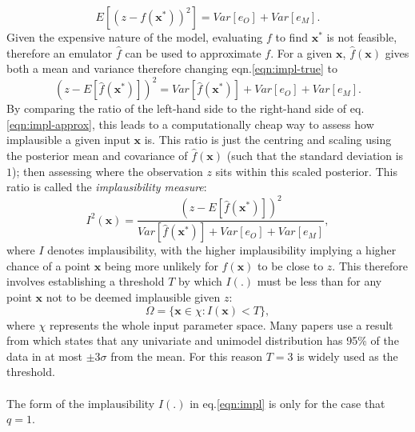 \documentclass{article}
\newcommand{\numOutputs}{q}
\newcommand{\simulator}{f}
\newcommand{\emulator}{\hat{f}}
\newcommand{\inputVec}{\mathbf{x}}
\newcommand{\obs}{z}
\newcommand{\obsError}{e_O}
\newcommand{\modelDisc}{e_M}
\newcommand{\paramSpace}{\chi}
\newcommand{\impl}{I}
\newcommand{\NROYspace}{\Omega}
\newcommand{\SD}{\sigma}
\newcommand{\thresh}{T}
\begin{document}
\begin{equation}
    \label{eqn:impl-true}
    E\left[(\obs - \simulator(\inputVec^*))^2 \right] = Var[\obsError] + Var[\modelDisc].
\end{equation}
Given the expensive nature of the model, evaluating $\simulator$ to find $\inputVec^*$ is not feasible, therefore an emulator $\emulator$ can be used to approximate $\simulator$. For a given $\inputVec$, $\emulator(\inputVec)$ gives both a mean and variance therefore changing eqn.\eqref{eqn:impl-true} to
\begin{equation}
    \label{eqn:impl-approx}
    \left(\obs - E\left[\emulator(\inputVec^*)\right]\right)^2 = Var\left[\emulator(\inputVec^*)\right] + Var[\obsError] + Var[\modelDisc].
\end{equation}
By comparing the ratio of the left-hand side to the right-hand side of eq.\eqref{eqn:impl-approx}, this leads to a computationally cheap way to assess how implausible a given input $\inputVec$ is. This ratio is just the centring and scaling using the posterior mean and covariance of $\emulator(\inputVec)$ (such that the standard deviation is $1$); then assessing where the observation $\obs$ sits within this scaled posterior. This ratio is called the {\it implausibility measure}:
\begin{equation}
    \nonumber
    \impl^2(\inputVec) = \frac{\left(\obs - E\left[\emulator(\inputVec^*)\right]\right)^2}{Var\left[\emulator(\inputVec^*)\right] + Var[\obsError] + Var[\modelDisc]},
\end{equation}
where $\impl$ denotes implausibility, with the higher implausibility implying a higher chance of a point $\inputVec$ being more unlikely for $\simulator(\inputVec)$ to be close to $\obs$. 
This therefore involves establishing a threshold $\thresh$ by which $\impl(.)$ must be less than for any point $\inputVec$ not to be deemed implausible given $\obs$:
\begin{equation}
    \label{eqn:threshold}
    \NROYspace = \{\inputVec \in \paramSpace: \impl(\inputVec)<\thresh\},
\end{equation}
where $\paramSpace$ represents the whole input parameter space.
Many papers \citep{Craig1997,Vernon2010,Iskauskas2022,Williamson2017} use a result from \citet{Pukelsheim1994} which states that any univariate and unimodel distribution has 95\% of the data in at most $\pm 3\SD$ from the mean. For this reason $\thresh=3$ is widely used as the threshold.\\\\
The form of the implausibility $\impl(.)$ in eq.\eqref{eqn:impl} is only for the case that $\numOutputs=1$.\\\\
\end{document}
